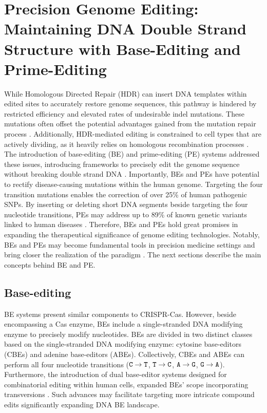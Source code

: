 \documentclass[a4paper, titlepage, openright]{book}
\begin{document}
\section{Precision Genome Editing: Maintaining DNA Double Strand Structure with Base-Editing and Prime-Editing}
While Homologous Directed Repair (HDR) can insert DNA templates within edited sites to accurately restore genome sequences, this pathway is hindered by restricted efficiency and elevated rates of undesirable indel mutations. These mutations often offset the potential advantages gained from the mutation repair process \citep{kantor2020crispr}. Additionally, HDR-mediated editing is constrained to cell types that are actively dividing, as it heavily relies on homologous recombination processes \citep{bollen2018create}. The introduction of base-editing (BE) and prime-editing (PE) systems addressed these issues, introducing frameworks to precisely edit the genome sequence without breaking double strand DNA \citep{komor2017crispr,anzalone2019search}. Importantly, BEs and PEs have potential to rectify disease-causing mutations within the human genome. Targeting the four transition mutations enables the correction of over 25\% of human pathogenic SNPs. By inserting or deleting short DNA segments beside targeting the four nucleotide transitions, PEs may address up to 89\% of known genetic variants linked to human diseases \citep{komor2017crispr,anzalone2019search,kantor2020crispr}. Therefore, BEs and PEs hold great promises in expanding the therapeutical significance of genome editing technologies. Notably, BEs and PEs may become fundamental tools in precision medicine settings and bring closer the realization of the paradigm \citep{porto2020base}. The next sections describe the main concepts behind BE and PE.

\subsection{Base-editing}
BE systems present similar components to CRISPR-Cas. However, beside encompassing a Cas enzyme, BEs include a single-stranded DNA modifying enzyme to precisely modify nucleotides. BEs are divided in two distinct classes based on the single-stranded DNA modifying enzyme: cytosine base-editors (CBEs) and adenine base-editors (ABEs). Collectively, CBEs and ABEs can perform all four nucleotide transitions ($\text{\texttt{C}} \rightarrow \text{\texttt{T}}$, $\text{\texttt{T}} \rightarrow \text{\texttt{C}}$, $\text{\texttt{A}} \rightarrow \text{\texttt{G}}$, $\text{\texttt{G}} \rightarrow \text{\texttt{A}}$). Furthermore, the introduction of dual base-editor systems designed for combinatorial editing within human cells, expanded BEs' scope incorporating transversions \citep{kurt2021crispr,grunewald2020dual,sakata2020base,zhang2020dual}. Such advances may facilitate targeting more intricate compound edits significantly expanding DNA BE landscape.
\end{document}
